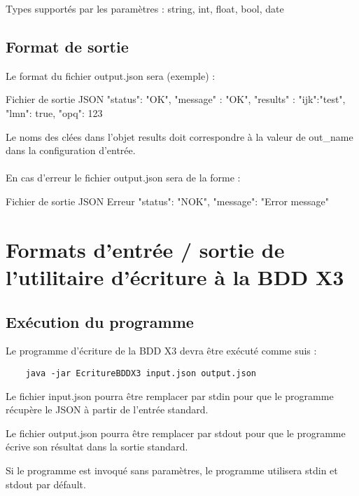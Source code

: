 Types supportés par les paramètres : string, int, float, bool, date

\subsection{Format de sortie}

Le format du fichier output.json sera (exemple) :

\begin{Python}{Fichier de sortie JSON}
    {
        "status": "OK",
        "message" : "OK",
        "results" : {
            "ijk":"test",
            "lmn": true,
            "opq": 123   
        }
    }
\end{Python}

Le noms des clées dans l'objet results doit correspondre à la valeur de out\_name dans la configuration d'entrée.
\\ \\
En cas d’erreur le fichier output.json sera de la forme :

\begin{Python}{Fichier de sortie JSON Erreur}
    {
        "status": "NOK",
        "message": "Error message"
    }
\end{Python}


\section{Formats d'entrée / sortie de l'utilitaire d'écriture à la BDD X3}

\subsection{Exécution du programme}

Le programme d’écriture de la BDD X3 devra être exécuté comme suis :

\begin{verbatim}
    java -jar EcritureBDDX3 input.json output.json
\end{verbatim}

Le fichier input.json pourra être remplacer par stdin pour que le programme récupère le JSON à partir de l’entrée standard.

Le fichier output.json pourra être remplacer par stdout pour que le programme écrive son résultat dans la sortie standard.

Si le programme est invoqué sans paramètres, le programme utilisera stdin et stdout par défault.


